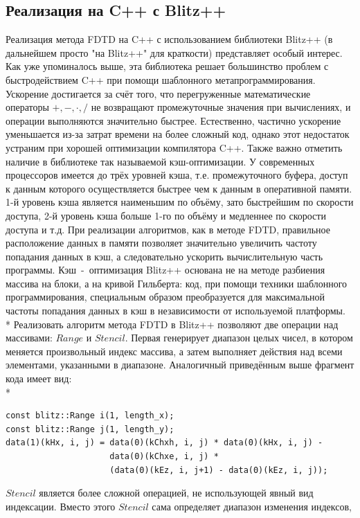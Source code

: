 \documentclass[10pt]{article}
\begin{document}
\subsection{Реализация на C++ с  Blitz++}
Реализация метода FDTD на C++ с использованием библиотеки Blitz++
(в дальнейшем просто "на Blitz++" для краткости) представляет особый интерес.
Как уже упоминалось выше, эта библиотека решает большинство проблем с
быстродействием C++ при помощи шаблонного метапрограммирования. Ускорение
достигается за счёт того, что перегруженные математические операторы 
$+,-,\cdot,/$ не возвращают промежуточные значения при вычислениях, и операции
выполняются значительно быстрее. Естественно, частично ускорение уменьшается 
из-за затрат времени на более сложный код, однако этот недостаток устраним при 
хорошей оптимизации компилятора C++. Также важно отметить наличие в библиотеке 
так называемой кэш-оптимизации. У современных процессоров имеется до трёх
уровней кэша, т.е. промежуточного буфера, доступ к данным которого 
осуществляется быстрее чем к данным в оперативной памяти. 1-й уровень кэша 
является наименьшим по объёму, зато быстрейшим по скорости доступа, 2-й уровень
кэша больше 1-го по объёму и медленнее по скорости доступа и т.д. При реализации
алгоритмов, как в методе FDTD, правильное расположение данных в памяти 
позволяет значительно увеличить частоту попадания данных в кэш, а следовательно
ускорить вычислительную часть программы. Кэш~-~оптимизация Blitz++ основана не
на методе разбиения массива на блоки, а на кривой Гильберта: код, при помощи 
техники шаблонного программирования, специальным образом преобразуется для
максимальной частоты попадания данных в кэш в независимости от используемой
платформы.\\*
Реализовать алгоритм метода FDTD в Blitz++ позволяют две операции над массивами:
$Range$ и $Stencil$. Первая генерирует диапазон целых чисел, в котором меняется
произвольный индекс массива, а затем выполняет действия над всеми элементами,
указанными в диапазоне. Аналогичный приведённым выше фрагмент кода имеет вид:\\*
\begin{verbatim}
const blitz::Range i(1, length_x);
const blitz::Range j(1, length_y);
data(1)(kHx, i, j) = data(0)(kChxh, i, j) * data(0)(kHx, i, j) -
                     data(0)(kChxe, i, j) *
                     (data(0)(kEz, i, j+1) - data(0)(kEz, i, j));
\end{verbatim}
$Stencil$ является более сложной операцией, не использующей явный вид 
индексации. Вместо этого $Stencil$ сама определяет диапазон изменения индексов,
\end{document}

